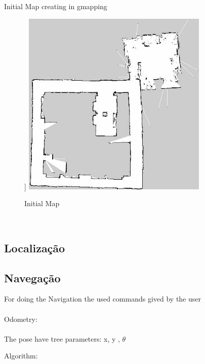 \documentclass[journal]{IEEEtran}
\begin{document}
	Initial Map creating in gmapping
	\begin{figure}[[ht]]
	\centering
	\includegraphics[width=21pc]{map.jpeg}
	\caption{Initial Map}
	\label{fig_env}
	\end{figure}
	\\

\subsection{Localização}

%
%

\subsection{Navegação}


	For doing the Navigation the used commands gived by the user
	\\
	\\
	Odometry:
	\\
	\\
	The pose have tree parameters: x, y , $\theta$




	Algorithm:
\end{document}
